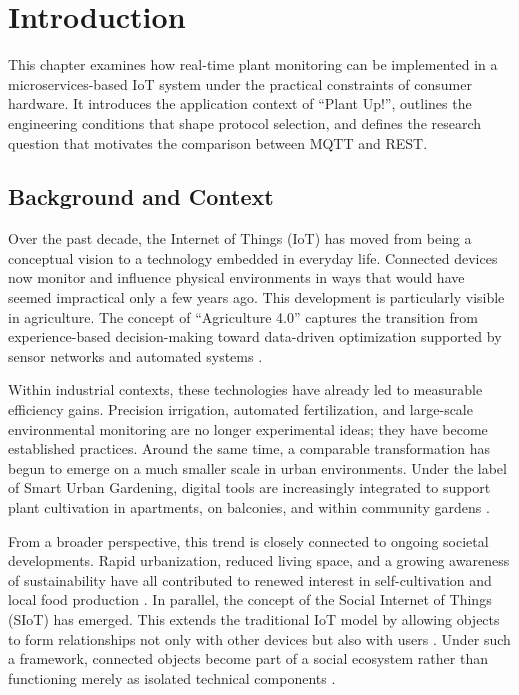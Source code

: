 \section{Introduction}

This chapter examines how real-time plant monitoring can be implemented in a microservices-based IoT system under the practical constraints of consumer hardware. It introduces the application context of ``Plant Up!'', outlines the engineering conditions that shape protocol selection, and defines the research question that motivates the comparison between MQTT and REST.

\subsection{Background and Context}

Over the past decade, the Internet of Things (IoT) has moved from being a conceptual vision to a technology embedded in everyday life. Connected devices now monitor and influence physical environments in ways that would have seemed impractical only a few years ago. This development is particularly visible in agriculture. The concept of ``Agriculture 4.0'' captures the transition from experience-based decision-making toward data-driven optimization supported by sensor networks and automated systems \cite{leherAg40}.

Within industrial contexts, these technologies have already led to measurable efficiency gains. Precision irrigation, automated fertilization, and large-scale environmental monitoring are no longer experimental ideas; they have become established practices. Around the same time, a comparable transformation has begun to emerge on a much smaller scale in urban environments. Under the label of Smart Urban Gardening, digital tools are increasingly integrated to support plant cultivation in apartments, on balconies, and within community gardens \cite{streetsolverSmartGarden}.

From a broader perspective, this trend is closely connected to ongoing societal developments. Rapid urbanization, reduced living space, and a growing awareness of sustainability have all contributed to renewed interest in self-cultivation and local food production \cite{growdirectorUrbanAg}. In parallel, the concept of the Social Internet of Things (SIoT) has emerged. This extends the traditional IoT model by allowing objects to form relationships not only with other devices but also with users \cite{bpbSiot}. Under such a framework, connected objects become part of a social ecosystem rather than functioning merely as isolated technical components \cite{jungWeon2025}.

